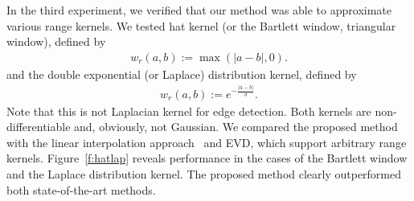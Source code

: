 \documentclass{article}
\begin{document}
In the third experiment, we verified that our method was able to approximate various range kernels. We tested hat kernel (or the Bartlett window, triangular window), defined by
\begin{align}
w_r(a,b) := \max(|a-b|,0).
\label{eq:th}
\end{align}
and the double exponential (or Laplace) distribution kernel, defined by
\begin{align}
w_r(a,b) := e^{-\frac{|a-b|}{\sigma}}.
\label{eq:th2}
\end{align}
Note that this is not Laplacian kernel for edge detection.
Both kernels are non-differentiable and, obviously, not Gaussian.
We compared the proposed method with the linear interpolation approach~\cite{yang2009realtime} and EVD, which support arbitrary range kernels.
Figure~\ref{f:hatlap} reveals performance in the cases of the Bartlett window and the Laplace distribution kernel.
The proposed method clearly outperformed both state-of-the-art methods.

\end{document}
